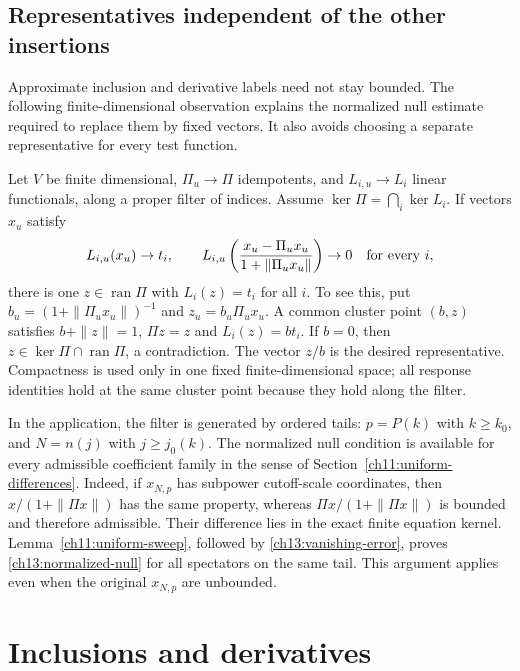 \subsection{Representatives independent of the other insertions}

Approximate inclusion and derivative labels need not stay bounded.
The following finite-dimensional observation explains the normalized
null estimate required to replace them by fixed vectors. It also
avoids choosing a separate representative for every test function.

Let $V$ be finite dimensional, $\Pi_u\to\Pi$ idempotents, and
$L_{i,u}\to L_i$ linear functionals, along a proper filter of indices.
Assume $\ker\Pi=\bigcap_i\ker L_i$. If vectors $x_u$ satisfy
\begin{equation}
 L_{i,u}(x_u)\to t_i,\qquad
 L_{i,u}\left(\frac{x_u-\Pi_ux_u}{1+\|\Pi_ux_u\|}\right)\to0
                              \quad\hbox{for every }i,
 \label{ch13:normalized-null}
\end{equation}
there is one $z\in\operatorname{ran}\Pi$ with $L_i(z)=t_i$ for
all $i$. To see this, put $b_u=(1+\|\Pi_ux_u\|)^{-1}$ and
$z_u=b_u\Pi_ux_u$. A common cluster point $(b,z)$ satisfies
$b+\|z\|=1$, $\Pi z=z$ and $L_i(z)=bt_i$. If $b=0$, then
$z\in\ker\Pi\cap\operatorname{ran}\Pi$, a contradiction.
The vector $z/b$ is the desired representative. Compactness is used
only in one fixed finite-dimensional space; all response identities
hold at the same cluster point because they hold along the filter.

In the application, the filter is generated by ordered tails:
$p=P(k)$ with $k\ge k_0$, and $N=n(j)$ with $j\ge j_0(k)$.
The normalized null condition is available for every admissible
coefficient family in the sense of Section~\ref{ch11:uniform-differences}.
Indeed, if $x_{N,p}$ has subpower cutoff-scale coordinates, then
$x/(1+\|\Pi x\|)$ has the same property, whereas
$\Pi x/(1+\|\Pi x\|)$ is bounded and therefore admissible.
Their difference lies in the exact finite equation kernel.
Lemma~\ref{ch11:uniform-sweep}, followed by
\eqref{ch13:vanishing-error}, proves
\eqref{ch13:normalized-null} for all spectators on the same tail.
This argument applies even when the original $x_{N,p}$ are unbounded.

\section{Inclusions and derivatives}
\label{ch13:calculus}

